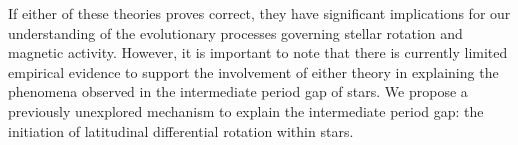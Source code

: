 
%

If either of these theories proves correct, they have significant implications for our understanding of the evolutionary processes governing stellar rotation and magnetic activity. 
However, it is important to note that there is currently limited empirical evidence to support the involvement of either theory in explaining the phenomena observed in the intermediate period gap of stars.
We propose a previously unexplored mechanism to explain the intermediate period gap: the initiation of latitudinal differential rotation within stars. 

